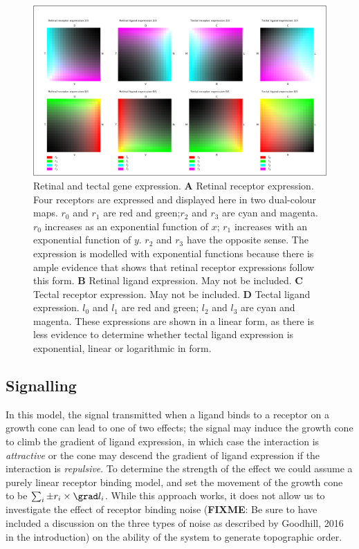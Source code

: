 \documentclass[11pt, a4paper]{article}
\begin{document}
\begin{figure}
\includegraphics[width=\linewidth]{./images/expressions_fig.png}
\caption{Retinal and tectal gene expression.
%
\textbf{A} Retinal receptor expression. Four receptors are expressed and
displayed here in two dual-colour maps. $r_0$ and $r_1$ are red and
green;$r_2$ and $r_3$ are cyan and magenta. $r_0$ increases as an
exponential function of $x$; $r_1$ increases with an exponential function of
$y$. $r_2$ and $r_3$ have the opposite sense. The expression is modelled with
exponential functions because there is ample evidence that shows that retinal
receptor expressions follow this form.
%
\textbf{B} Retinal ligand expression. May not be included.
%
\textbf{C} Tectal receptor expression. May not be included.
%
\textbf{D} Tectal ligand expression. $l_0$ and $l_1$ are red and green; $l_2$
and $l_3$ are cyan and magenta. These expressions are shown in a linear form,
as there is less evidence to determine whether tectal ligand expression is
exponential, linear or logarithmic in form.
}
\label{f:1}
\end{figure}

\subsection{Signalling}

In this model, the signal transmitted when a ligand binds to a receptor on a
growth cone can lead to one of two effects; the signal may induce the growth
cone to climb the gradient of ligand expression, in which case the interaction
is \emph{attractive} or the cone may descend the gradient of ligand expression
if the interaction is \emph{repulsive}. To determine the strength of the
effect we could assume a purely linear receptor binding model, and set the
movement of the growth cone to be $\sum_i \pm r_i \times \grad l_i$. While
this approach works, it does not allow us to investigate the effect of
receptor binding noise (\textbf{FIXME}: Be sure to have included a discussion
on the three types of noise as described by Goodhill, 2016 in the
introduction) on the ability of the system to generate topographic order.
\end{document}
